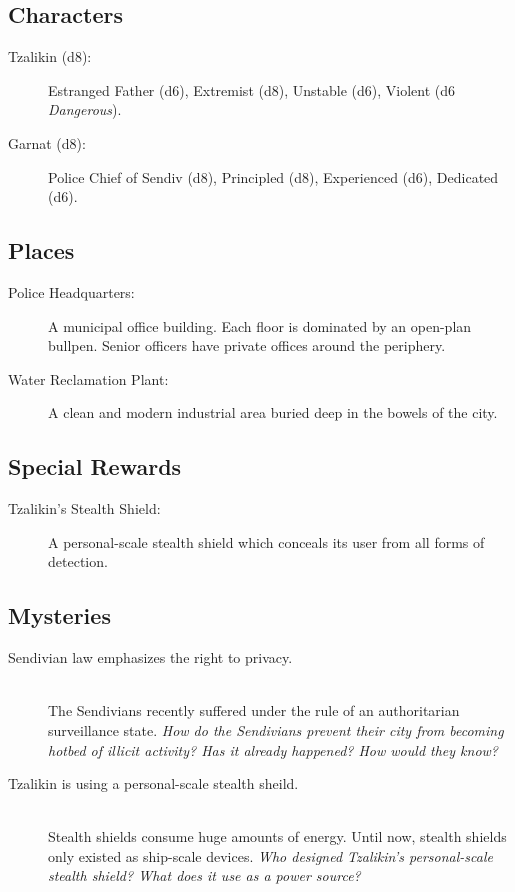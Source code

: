 \newpage

\subsection*{Characters}
\begin{description}
	\item[Tzalikin (d8):] Estranged Father (d6), Extremist (d8), Unstable (d6), Violent (d6 \textit{Dangerous}).
	\item[Garnat (d8):] Police Chief of Sendiv (d8), Principled (d8), Experienced (d6), Dedicated (d6).
\end{description}

\subsection*{Places}
\begin{description}
	\item[Police Headquarters:] A municipal office building. Each floor is dominated by an open-plan bullpen. Senior officers have private offices around the periphery.
	\item[Water Reclamation Plant:] A clean and modern industrial area buried deep in the bowels of the city.
\end{description}

\subsection*{Special Rewards}
\begin{description}
	\item[Tzalikin's Stealth Shield:] A personal-scale stealth shield which conceals its user from all forms of detection.
\end{description} 

\subsection*{Mysteries}
\begin{description}
	\item[Sendivian law emphasizes the right to privacy.] \phantom{a} \\ The Sendivians recently suffered under the rule of an authoritarian surveillance state. \textit{How do the Sendivians prevent their city from becoming hotbed of illicit activity? Has it already happened?  How would they know?}
	\item[Tzalikin is using a personal-scale stealth sheild.] \phantom{a} \\ Stealth shields consume huge amounts of energy. Until now, stealth shields only existed as ship-scale devices. \textit{Who designed Tzalikin's personal-scale stealth shield? What does it use as a power source?}
\end{description}